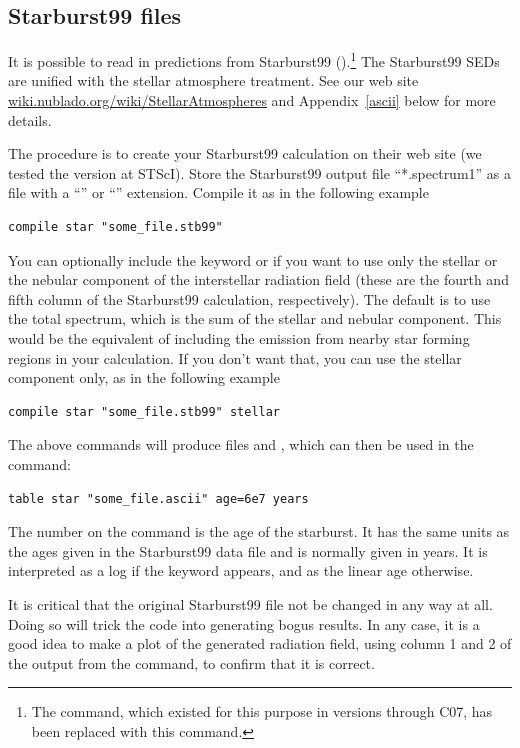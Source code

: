 \subsection{Starburst99 files}

It is possible to read in predictions from Starburst99 
(\citealp{Leitherer1999}).\footnote{The  command, 
which existed for this purpose in versions through C07, has been replaced
with this   command.}
The Starburst99 SEDs are unified with the stellar
atmosphere treatment.
See our web site
\href{http://wiki.nublado.org/wiki/StellarAtmospheres}{wiki.nublado.org/wiki/StellarAtmospheres} and
Appendix~\ref{ascii} below for more details.

The procedure is to create your Starburst99 calculation on their web site
(we tested the version at STScI).
Store the Starburst99 output file ``*.spectrum1'' as
a file with a ``''  or ``'' extension.
Compile it as in the following example
\begin{verbatim}
compile star "some_file.stb99"
\end{verbatim}
You can optionally include the keyword  or
 if you want to use only the stellar or the nebular
component of the interstellar radiation field (these are the fourth and fifth
column of the Starburst99 calculation, respectively). The default is to use
the total spectrum, which is the sum of the stellar and nebular component.
This would be the equivalent of including the emission from nearby star
forming regions in your calculation. If you don't want that, you can use the
stellar component only, as in the following example
\begin{verbatim}
compile star "some_file.stb99" stellar
\end{verbatim}
The above commands will produce files  and
, which can then
be used in the  command:
\begin{verbatim}
table star "some_file.ascii" age=6e7 years
\end{verbatim}

The number on the  command is the
age of the starburst.  It has the same units as the ages given in the
Starburst99 data file and is normally given in years.
It is interpreted as a log if the keyword  appears,
and as the linear age otherwise.

It is critical that the original Starburst99 file not be
changed in any way at all.
Doing so will trick the code into generating bogus results.
In any case, it is a good idea to make a plot of the generated
radiation field,
using column 1 and 2 of the output from
the  command, to confirm that it is correct.

